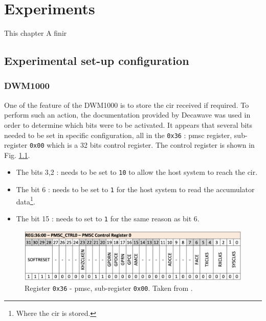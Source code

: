 \chapter{Experiments}

This chapter \color{red} A finir \color{black}

\section{Experimental set-up configuration}

\subsection{DWM1000}

One of the feature of the DWM1000 is to store the \gls{cir} received if required. To perform such an action, the documentation provided by Decawave \cite{usermanual} was used in order to determine which bits were to be activated. It appears that several bits needed to be set in specific configuration, all in the \texttt{0x36} : \gls{pmsc} register, sub-register \texttt{0x00} which is a 32 bits control register. The control register is shown in Fig. \ref{fig:control_reg}.
\vspace{2mm}

\begin{itemize}
\item The bits 3,2 :    needs to be set to \texttt{10} to allow the host system to reach the \gls{cir}.
\item The bit 6 :  needs to be set to \texttt{1} for the host system to read the accumulator data\footnote{Where the \gls{cir} is stored.}.
\item The bit 15 :  needs to set to \texttt{1} for the same reason as bit 6.
\end{itemize}

\begin{figure}[H]
\centering
\includegraphics[width=.9\linewidth]{Images/control_ref.png}
\caption{Register \texttt{0x36} - \gls{pmsc}, sub-register \texttt{0x00}. Taken from \cite{usermanual}. \label{fig:control_reg}}
\end{figure}

